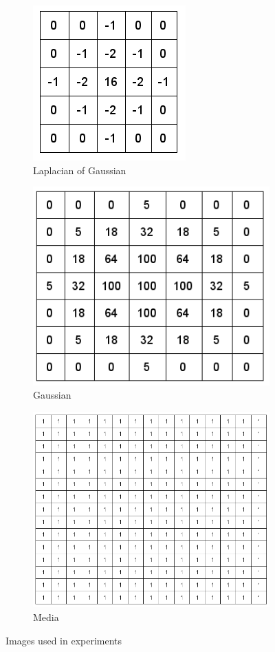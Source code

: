 \begin{figure}[h!]
\begin{subfigure}{0.3\textwidth}
  \centering
  \includegraphics[width=0.5\linewidth]{figs/laplacian-of-gaussian.png}
  \caption{Laplacian of Gaussian}
\end{subfigure}
\begin{subfigure}{0.3\textwidth}
  \centering
  \includegraphics[width=0.9\linewidth]{figs/gaussian.png}
  \caption{Gaussian}
\end{subfigure}%
\begin{subfigure}{0.7\textwidth}
  \centering
  \includegraphics[width=0.9\linewidth]{figs/media.png}
  \caption{Media}
\end{subfigure}
 \caption{Images used in experiments}
\label{fig:conv-kernels}
\end{figure}

